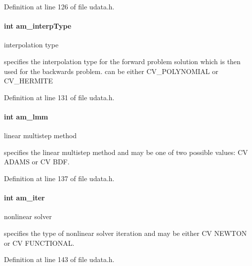Definition at line 126 of file udata.\+h.

\hypertarget{struct_user_data_a02adc800558b1cdac3fa8bc96e65dbbb}{}
\paragraph[{am\+\_\+interp\+Type}]{\setlength{\rightskip}{0pt plus 5cm}int am\+\_\+interp\+Type}\label{struct_user_data_a02adc800558b1cdac3fa8bc96e65dbbb}
interpolation type

specifies the interpolation type for the forward problem solution which is then used for the backwards problem. can be either C\+V\+\_\+\+P\+O\+L\+Y\+N\+O\+M\+I\+A\+L or C\+V\+\_\+\+H\+E\+R\+M\+I\+T\+E 

Definition at line 131 of file udata.\+h.

\hypertarget{struct_user_data_a18b6fbc6159783acab9b5f4b106077cd}{}
\paragraph[{am\+\_\+lmm}]{\setlength{\rightskip}{0pt plus 5cm}int am\+\_\+lmm}\label{struct_user_data_a18b6fbc6159783acab9b5f4b106077cd}
linear multistep method

specifies the linear multistep method and may be one of two possible values\+: C\+V A\+D\+A\+M\+S or C\+V B\+D\+F. 

Definition at line 137 of file udata.\+h.

\hypertarget{struct_user_data_a2e0183eade68209e6835d3199054f0cc}{}
\paragraph[{am\+\_\+iter}]{\setlength{\rightskip}{0pt plus 5cm}int am\+\_\+iter}\label{struct_user_data_a2e0183eade68209e6835d3199054f0cc}
nonlinear solver

specifies the type of nonlinear solver iteration and may be either C\+V N\+E\+W\+T\+O\+N or C\+V F\+U\+N\+C\+T\+I\+O\+N\+A\+L. 

Definition at line 143 of file udata.\+h.

\hypertarget{struct_user_data_a7d39c238c319f0164a15744950bfd021}{}
